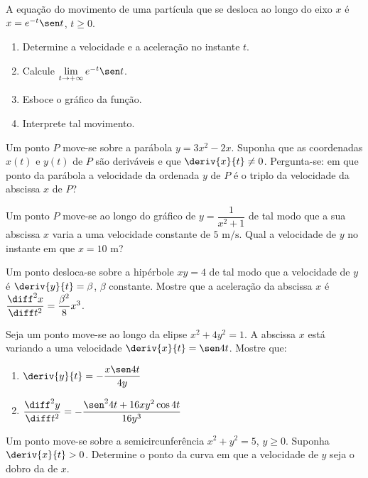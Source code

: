 \begin{exercicio}[10]
A equação do movimento de uma partícula que se desloca ao longo do eixo $x$ é $x = e^{-t}\sen t$, $t \ge 0$.
\begin{enumerate}[label=\alph*)]
    \item Determine a velocidade e a aceleração no instante $t$.
    \item Calcule $\lim\limits_{t \to +\infty} e^{-t}\sen t$.
    \item Esboce o gráfico da função.
    \item Interprete tal movimento.
\end{enumerate}
\end{exercicio}

\begin{exercicio}[11]
Um ponto $P$ move-se sobre a parábola $y = 3x^2 - 2x$. Suponha que as coordenadas $x(t)$ e $y(t)$ de $P$ são deriváveis e que $\deriv{x}{t} \neq 0$. Pergunta-se: em que ponto da parábola a velocidade da ordenada $y$ de $P$ é o triplo da velocidade da abscissa $x$ de $P$?
\end{exercicio}

\begin{exercicio}[12]
Um ponto $P$ move-se ao longo do gráfico de $y = \dfrac{1}{x^2 + 1}$ de tal modo que a sua abscissa $x$ varia a uma velocidade constante de $5\text{ m/s}$. Qual a velocidade de $y$ no instante em que $x = 10\text{ m}$?
\end{exercicio}

\begin{exercicio}[13]
Um ponto desloca-se sobre a hipérbole $xy = 4$ de tal modo que a velocidade de $y$ é $\deriv{y}{t} = \beta$, $\beta$ constante. Mostre que a aceleração da abscissa $x$ é $\dfrac{\diff^2x}{\diff t^2} = \dfrac{\beta^2}{8}x^3$.
\end{exercicio}

\begin{exercicio}[14]
Seja um ponto move-se ao longo da elipse $x^2 + 4y^2 = 1$. A abscissa $x$ está variando a uma velocidade $\deriv{x}{t} = \sen 4t$. Mostre que:
\begin{enumerate}[label=\alph*)]
    \item $\deriv{y}{t} = -\dfrac{x\sen 4t}{4y}$
    \item $\dfrac{\diff^2y}{\diff t^2} = -\dfrac{\sen^2 4t + 16xy^2 \cos 4t}{16y^3}$
\end{enumerate}
\end{exercicio}

\begin{exercicio}[15]
Um ponto move-se sobre a semicircunferência $x^2 + y^2 = 5$, $y \ge 0$. Suponha $\deriv{x}{t} > 0$. Determine o ponto da curva em que a velocidade de $y$ seja o dobro da de $x$.
\end{exercicio}

